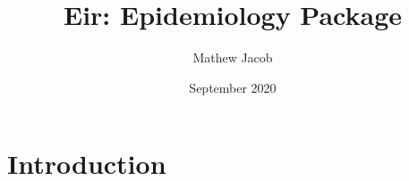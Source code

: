 \documentclass{article}
\title{Eir: Epidemiology Package}
\author{Mathew Jacob}
\date{September 2020}
\begin{document}
\maketitle

\section{Introduction}
\end{document}
